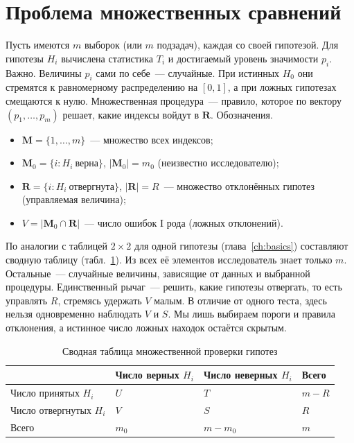 \section{Проблема множественных сравнений}

Пусть имеются $m$ выборок (или $m$ подзадач), каждая со своей гипотезой.
Для гипотезы $H_i$ вычислена статистика $T_i$ и достигаемый уровень значимости $p_i$.
Важно. Величины $p_i$ сами по себе~--- случайные. При истинных $H_0$ они стремятся к равномерному распределению на $[0,1]$, а при ложных гипотезах смещаются к нулю. Множественная процедура~--- правило, которое по вектору $(p_1,\ldots,p_m)$ решает, какие индексы войдут в $\mathbf{R}$.
Обозначения.
\begin{itemize}
    \item $\mathbf{M}=\{1,\ldots,m\}$~--- множество всех индексов;
    \item $\mathbf{M}_0=\{i\colon H_i\ \text{верна}\}$, $|\mathbf{M}_0|=m_0$
(неизвестно исследователю);
    \item $\mathbf{R}=\{i\colon H_i\ \text{отвергнута}\}$, $|\mathbf{R}|=R$~---
множество отклонённых гипотез (управляемая величина);
    \item $V=|\mathbf{M}_0\cap\mathbf{R}|$~--- число ошибок I рода
          (ложных отклонений).
\end{itemize}

По аналогии с таблицей $2\times 2$ для одной гипотезы (глава~\ref{ch:basics}) составляют сводную таблицу (табл.~\ref{tab:mht-setup}).
Из всех её элементов исследователь знает только $m$. Остальные~--- случайные величины, зависящие от данных и выбранной процедуры.
Единственный рычаг~--- решить, какие гипотезы отвергать, то есть управлять $R$, стремясь удержать $V$ малым.
В отличие от одного теста, здесь нельзя одновременно наблюдать $V$ и $S$. Мы лишь выбираем пороги и правила отклонения, а истинное число ложных находок остаётся скрытым.

\begin{table}[htbp]
    \centering
    \caption{Сводная таблица множественной проверки гипотез}
    \label{tab:mht-setup}
    \footnotesize
    \begin{tabularx}{\linewidth}{|>{\raggedright\arraybackslash}X|>{\centering\arraybackslash}X|>{\centering\arraybackslash}X|>{\centering\arraybackslash}X|}
        \hline
        & Число верных $H_i$ & Число неверных $H_i$ & Всего \\
        \hline
        Число принятых $H_i$ & $U$ & $T$ & $m-R$ \\
        \hline
        Число отвергнутых $H_i$ & $V$ & $S$ & $R$ \\
        \hline
        Всего & $m_0$ & $m-m_0$ & $m$ \\
        \hline
    \end{tabularx}
\end{table}


